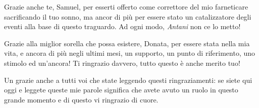 Grazie anche te, Samuel, per esserti offerto come correttore del mio farneticare sacrificando il tuo sonno, ma ancor di più per essere stato un catalizzatore degli eventi alla base di questo traguardo. Ad ogni modo, \emph{Antani} non ce lo metto!

Grazie alla miglior sorella che possa esistere, Donata, per essere stata nella mia vita, e ancora di più negli ultimi mesi, un supporto, un punto di riferimento, uno stimolo ed un'ancora! Ti ringrazio davvero, tutto questo è anche merito tuo!

Un grazie anche a tutti voi che state leggendo questi ringraziamenti: se siete qui oggi e leggete queste mie parole significa che avete avuto un ruolo in questo grande momento e di questo vi ringrazio di cuore.

